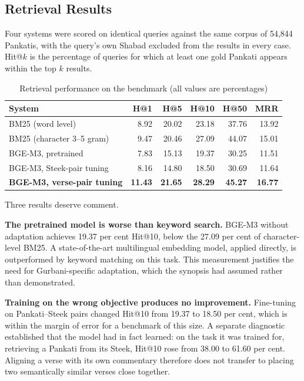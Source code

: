 \documentclass[12pt,a4paper]{article}
\begin{document}
\subsection{Retrieval Results}

Four systems were scored on identical queries against the same corpus of 54,844 Pankatis, with the query's own Shabad excluded from the results in every case. Hit@$k$ is the percentage of queries for which at least one gold Pankati appears within the top $k$ results.

\begin{table}[H]
\centering
\renewcommand{\arraystretch}{1.35}
\caption{Retrieval performance on the benchmark (all values are percentages)}
\begin{tabular}{|p{4.9cm}|r|r|r|r|r|}
\hline
\textbf{System} & \textbf{H@1} & \textbf{H@5} & \textbf{H@10} & \textbf{H@50} & \textbf{MRR} \\
\hline
BM25 (word level) & 8.92 & 20.02 & 23.18 & 37.76 & 13.92 \\
\hline
BM25 (character 3--5 gram) & 9.47 & 20.46 & 27.09 & 44.07 & 15.01 \\
\hline
BGE-M3, pretrained & 7.83 & 15.13 & 19.37 & 30.25 & 11.51 \\
\hline
BGE-M3, Steek-pair tuning & 8.16 & 14.80 & 18.50 & 30.69 & 11.64 \\
\hline
\textbf{BGE-M3, verse-pair tuning} & \textbf{11.43} & \textbf{21.65} & \textbf{28.29} & \textbf{45.27} & \textbf{16.77} \\
\hline
\end{tabular}
\end{table}

\vspace{0.3cm}

Three results deserve comment.

\vspace{0.2cm}

\noindent\textbf{The pretrained model is worse than keyword search.}
BGE-M3 without adaptation achieves 19.37 per cent Hit@10, below the 27.09 per cent of character-level BM25. A state-of-the-art multilingual embedding model, applied directly, is outperformed by keyword matching on this task. This measurement justifies the need for Gurbani-specific adaptation, which the synopsis had assumed rather than demonstrated.

\vspace{0.2cm}

\noindent\textbf{Training on the wrong objective produces no improvement.}
Fine-tuning on Pankati--Steek pairs changed Hit@10 from 19.37 to 18.50 per cent, which is within the margin of error for a benchmark of this size. A separate diagnostic established that the model had in fact learned: on the task it was trained for, retrieving a Pankati from its Steek, Hit@10 rose from 38.00 to 61.60 per cent. Aligning a verse with its own commentary therefore does not transfer to placing two semantically similar verses close together.
\end{document}
